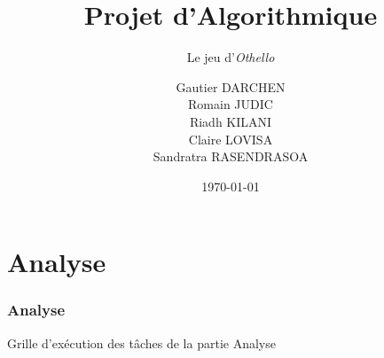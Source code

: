 \documentclass{beamer}
\title[Projet Othello]{Projet d'Algorithmique}
\subtitle{Le jeu d'\emph{Othello}}
\author[Groupe 1.5 ]{Gautier DARCHEN \\ Romain JUDIC \\ Riadh KILANI \\ Claire LOVISA \\ Sandratra RASENDRASOA}
\institute[]{INSA de Rouen}
\date{\today}
\newif\ifplacelogo
\begin{document}
\placelogotrue	
	\begin{frame} %
	\titlepage
	\end{frame}
	
	
	\section{Analyse}
	\begin{frame}[label=analyse] %
	\frametitle{Analyse}
	\begin{alertblock}{Grille d’exécution des tâches de la partie Analyse}
   	\rightskip=0pt\leftskip=0pt

	\end{alertblock}
	\end{frame}
	
\end{document}
